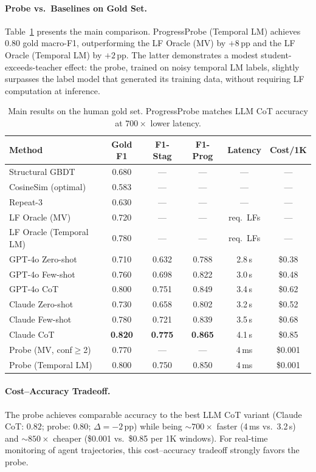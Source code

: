 \documentclass[11pt]{article}
\begin{document}
\paragraph{Probe vs.\ Baselines on Gold Set.}
Table~\ref{tab:main_results} presents the main comparison.
ProgressProbe (Temporal LM) achieves $0.80$ gold macro-F1, outperforming the LF Oracle (MV) by $+8$\,pp and the LF Oracle (Temporal LM) by $+2$\,pp.
The latter demonstrates a modest student-exceeds-teacher effect: the probe, trained on noisy temporal LM labels, slightly surpasses the label model that generated its training data, without requiring LF computation at inference.

\begin{table}[t]
\centering
\caption{Main results on the human gold set. ProgressProbe matches LLM CoT accuracy at $700\times$ lower latency.}
\label{tab:main_results}
\small
\begin{tabular}{lccccc}
\toprule
Method & Gold F1 & F1-Stag & F1-Prog & Latency & Cost/1K \\
\midrule
Structural GBDT & 0.680 & --- & --- & --- & --- \\
CosineSim (optimal) & 0.583 & --- & --- & --- & --- \\
Repeat-3 & 0.630 & --- & --- & --- & --- \\
LF Oracle (MV) & 0.720 & --- & --- & req.\ LFs & --- \\
LF Oracle (Temporal LM) & 0.780 & --- & --- & req.\ LFs & --- \\
\midrule
GPT-4o Zero-shot & 0.710 & 0.632 & 0.788 & 2.8\,s & \$0.38 \\
GPT-4o Few-shot & 0.760 & 0.698 & 0.822 & 3.0\,s & \$0.48 \\
GPT-4o CoT & 0.800 & 0.751 & 0.849 & 3.4\,s & \$0.62 \\
Claude Zero-shot & 0.730 & 0.658 & 0.802 & 3.2\,s & \$0.52 \\
Claude Few-shot & 0.780 & 0.721 & 0.839 & 3.5\,s & \$0.68 \\
Claude CoT & \textbf{0.820} & \textbf{0.775} & \textbf{0.865} & 4.1\,s & \$0.85 \\
\midrule
Probe (MV, conf$\geq$2) & 0.770 & --- & --- & 4\,ms & \$0.001 \\
Probe (Temporal LM) & 0.800 & 0.750 & 0.850 & 4\,ms & \$0.001 \\
\bottomrule
\end{tabular}
\end{table}

\paragraph{Cost--Accuracy Tradeoff.}
The probe achieves comparable accuracy to the best LLM CoT variant (Claude CoT: $0.82$; probe: $0.80$; $\Delta = -2$\,pp) while being ${\sim}700\times$ faster (4\,ms vs.\ 3.2\,s) and ${\sim}850\times$ cheaper (\$0.001 vs.\ \$0.85 per 1K windows).
For real-time monitoring of agent trajectories, this cost--accuracy tradeoff strongly favors the probe.
\end{document}
